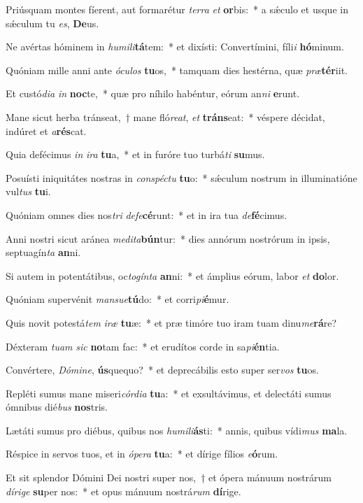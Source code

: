 \item Priúsquam montes fíerent, aut formarétur \textit{ter}\textit{ra} \textit{et} \textbf{or}bis:~* a sǽculo et usque in sǽculum tu \textit{es}, \textbf{De}us.
\item Ne avértas hóminem in \textit{hu}\textit{mi}\textit{li}\textbf{tá}tem:~* et dixísti: Convertímini, fíli\textit{i} \textbf{hó}minum.
\item Quóniam mille anni ante \textit{ó}\textit{cu}\textit{los} \textbf{tu}os,~* tamquam dies hestérna, quæ \textit{præ}\textbf{tér}iit.
\item Et custó\textit{di}\textit{a} \textit{in} \textbf{noc}te,~* quæ pro níhilo habéntur, eórum an\textit{ni} \textbf{e}runt.
\item Mane sicut herba tránseat,~† mane fló\textit{re}\textit{at}, \textit{et} \textbf{tráns}eat:~* véspere décidat, indúret et \textit{a}\textbf{rés}cat.
\item Quia defécimus \textit{in} \textit{i}\textit{ra} \textbf{tu}a,~* et in furóre tuo turbá\textit{ti} \textbf{su}mus.
\item Posuísti iniquitátes nostras in \textit{con}\textit{spéc}\textit{tu} \textbf{tu}o:~* sǽculum nostrum in illuminatióne vul\textit{tus} \textbf{tu}i.
\item Quóniam omnes dies nos\textit{tri} \textit{de}\textit{fe}\textbf{cé}runt:~* et in ira tua \textit{de}\textbf{fé}cimus.
\item Anni nostri sicut aránea \textit{me}\textit{di}\textit{ta}\textbf{bún}tur:~* dies annórum nostrórum in ipsis, septuagín\textit{ta} \textbf{an}ni.
\item Si autem in potentátibus, oc\textit{to}\textit{gín}\textit{ta} \textbf{an}ni:~* et ámplius eórum, labor \textit{et} \textbf{do}lor.
\item Quóniam supervénit \textit{man}\textit{su}\textit{e}\textbf{tú}do:~* et corri\textit{pi}\textbf{é}mur.
\item Quis novit potestá\textit{tem} \textit{i}\textit{ræ} \textbf{tu}æ:~* et præ timóre tuo iram tuam dinu\textit{me}\textbf{rá}re?
\item Déxteram \textit{tu}\textit{am} \textit{sic} \textbf{no}tam fac:~* et erudítos corde in sa\textit{pi}\textbf{én}tia.
\item Convértere, \textit{Dó}\textit{mi}\textit{ne}, \textbf{ús}quequo?~* et deprecábilis esto super ser\textit{vos} \textbf{tu}os.
\item Repléti sumus mane miseri\textit{cór}\textit{di}\textit{a} \textbf{tu}a:~* et exsultávimus, et delectáti sumus ómnibus dié\textit{bus} \textbf{nos}tris.
\item Lætáti sumus pro diébus, quibus nos \textit{hu}\textit{mi}\textit{li}\textbf{ás}ti:~* annis, quibus vídi\textit{mus} \textbf{ma}la.
\item Réspice in servos tuos, et in \textit{ó}\textit{pe}\textit{ra} \textbf{tu}a:~* et dírige fílios \textit{e}\textbf{ó}rum.
\item Et sit splendor Dómini Dei nostri super nos,~† et ópera mánuum nostrárum \textit{dí}\textit{ri}\textit{ge} \textbf{su}per nos:~* et opus mánuum nostrá\textit{rum} \textbf{dí}rige.
